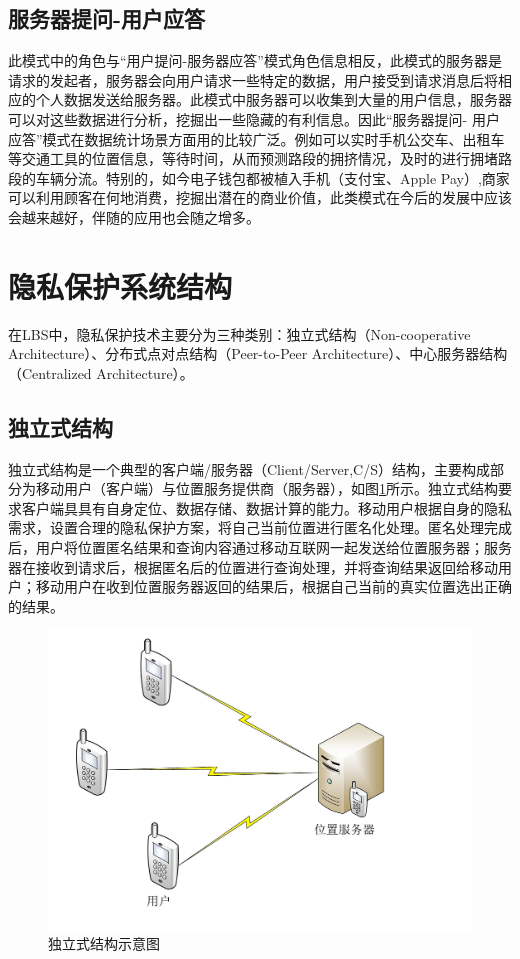\subsection{服务器提问-用户应答}
此模式中的角色与“用户提问-服务器应答”模式角色信息相反，此模式的服务器是请求的发起者，服务器会向用户请求一些特定的数据，用户接受到请求消息后将相应的个人数据发送给服务器。此模式中服务器可以收集到大量的用户信息，服务器可以对这些数据进行分析，挖掘出一些隐藏的有利信息。因此“服务器提问- 用户应答”模式在数据统计场景方面用的比较广泛。例如可以实时手机公交车、出租车等交通工具的位置信息，等待时间，从而预测路段的拥挤情况，及时的进行拥堵路段的车辆分流。特别的，如今电子钱包都被植入手机（支付宝、Apple Pay）,商家可以利用顾客在何地消费，挖掘出潜在的商业价值，此类模式在今后的发展中应该会越来越好，伴随的应用也会随之增多。
\section{隐私保护系统结构}
在LBS中，隐私保护技术主要分为三种类别：独立式结构（Non-cooperative Architecture）、分布式点对点结构（Peer-to-Peer Architecture）、中心服务器结构（Centralized Architecture）\cite{WuYinJie}。
\subsection{独立式结构}
独立式结构\cite{ChengR}是一个典型的客户端/服务器（Client/Server,C/S）结构，主要构成部分为移动用户（客户端）与位置服务提供商（服务器），如图\ref{fig:independentConstruction_pdf}所示。独立式结构要求客户端具具有自身定位、数据存储、数据计算的能力。移动用户根据自身的隐私需求，设置合理的隐私保护方案，将自己当前位置进行匿名化处理。匿名处理完成后，用户将位置匿名结果和查询内容通过移动互联网一起发送给位置服务器；服务器在接收到请求后，根据匿名后的位置进行查询处理，并将查询结果返回给移动用户；移动用户在收到位置服务器返回的结果后，根据自己当前的真实位置选出正确的结果。


\begin{figure}[H]
\centering
\includegraphics[width=15 cm]{fig/independentConstruction.pdf}
\caption{独立式结构示意图} %
\label{fig:independentConstruction_pdf}
\end{figure}

